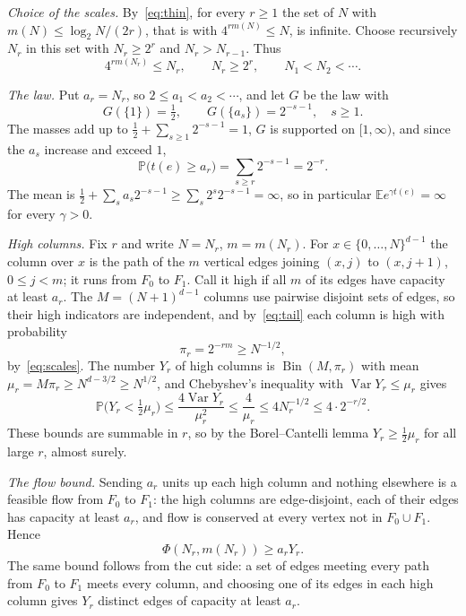 \documentclass[11pt]{amsart}
\theoremstyle{definition}
\theoremstyle{remark}
\DeclareMathOperator{\Var}{Var}
\DeclareMathOperator{\Bin}{Bin}
\newcommand{\E}{\mathbb{E}}
\renewcommand{\P}{\mathbb{P}}
\begin{document}
\emph{Choice of the scales.} By~\eqref{eq:thin}, for every $r\ge1$ the set of $N$ with $m(N)\le\log_2N/(2r)$, that is with $4^{rm(N)}\le N$, is infinite. Choose recursively $N_r$ in this set with $N_r\ge2^r$ and $N_r>N_{r-1}$. Thus
\begin{equation}\label{eq:scales}
4^{r m(N_r)}\le N_r,\qquad N_r\ge 2^r,\qquad N_1<N_2<\cdots.
\end{equation}

\emph{The law.} Put $a_r=N_r$, so $2\le a_1<a_2<\cdots$, and let $G$ be the law with
\[
G(\{1\})=\tfrac12,\qquad G(\{a_s\})=2^{-s-1},\quad s\ge1 .
\]
The masses add up to $\frac12+\sum_{s\ge1}2^{-s-1}=1$, $G$ is supported on $[1,\infty)$, and since the $a_s$ increase and exceed $1$,
\begin{equation}\label{eq:tail}
\P\bigl(t(e)\ge a_r\bigr)=\sum_{s\ge r}2^{-s-1}=2^{-r}.
\end{equation}
The mean is $\frac12+\sum_s a_s2^{-s-1}\ge\sum_s 2^s2^{-s-1}=\infty$, so in particular $\E e^{\gamma t(e)}=\infty$ for every $\gamma>0$.

\emph{High columns.} Fix $r$ and write $N=N_r$, $m=m(N_r)$. For $x\in\{0,\dots,N\}^{d-1}$ the column over $x$ is the path of the $m$ vertical edges joining $(x,j)$ to $(x,j+1)$, $0\le j<m$; it runs from $F_0$ to $F_1$. Call it high if all $m$ of its edges have capacity at least $a_r$. The $M=(N+1)^{d-1}$ columns use pairwise disjoint sets of edges, so their high indicators are independent, and by~\eqref{eq:tail} each column is high with probability
\[
\pi_r=2^{-rm}\ge N^{-1/2},
\]
by~\eqref{eq:scales}. The number $Y_r$ of high columns is $\Bin(M,\pi_r)$ with mean $\mu_r=M\pi_r\ge N^{d-3/2}\ge N^{1/2}$, and Chebyshev's inequality with $\Var Y_r\le\mu_r$ gives
\[
\P\bigl(Y_r<\tfrac12\mu_r\bigr)\le\frac{4\Var Y_r}{\mu_r^2}\le\frac4{\mu_r}\le 4N_r^{-1/2}\le 4\cdot2^{-r/2}.
\]
These bounds are summable in $r$, so by the Borel--Cantelli lemma $Y_r\ge\frac12\mu_r$ for all large $r$, almost surely.

\emph{The flow bound.} Sending $a_r$ units up each high column and nothing elsewhere is a feasible flow from $F_0$ to $F_1$: the high columns are edge-disjoint, each of their edges has capacity at least $a_r$, and flow is conserved at every vertex not in $F_0\cup F_1$. Hence
\[
\Phi(N_r,m(N_r))\ge a_rY_r .
\]
The same bound follows from the cut side: a set of edges meeting every path from $F_0$ to $F_1$ meets every column, and choosing one of its edges in each high column gives $Y_r$ distinct edges of capacity at least $a_r$.
\end{document}
